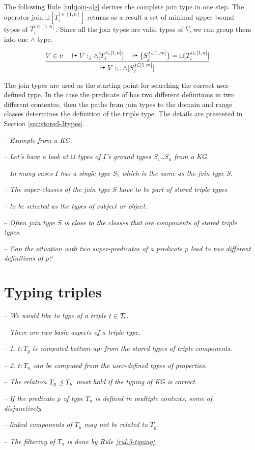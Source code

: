 \documentclass[runningheads]{llncs}
\newcommand{\darr}{\downarrow}
\newcommand{\vdasharr}{%
    \mathrel{%
        \vdash\hspace*{-5pt}%
        \raisebox{2.3pt}{\scalebox{.5}{\(\blacktriangleright\)}}%
    }%
}\newcommand{\D}{{\Delta}}
\newcommand{\T}{{\cal T}}
\newcommand{\notes}[1]{\noindent\begin{small}-- \emph{#1}\hfill\break\end{small}}
\newcommand{\nnotes}[1]{\indent\begin{small}-- \emph{#1}\hfill\break\end{small}}
\begin{document}
The following Rule \ref{rul:join-alg} derives the complete join type
in one step. The operator join $\sqcup[T_i^{i\in[1,n]}]$ returns as a
result a set of minimal upper bound types of $T_i^{i\in[1,n]}$. Since
all the join types are valid types of $V$, we can group them into one
$\land$ type.

\begin{equation}
\label{rul:join-alg} 
\dfrac{V\in\upsilon\quad\vdasharr\/V:_\darr\land[T_i^{i\in[1,n]}]\quad\/\vdasharr\{S_j^{j\in[1,m]}\}=\sqcup[T_i^{i\in[1,n]}]}
      {\vdasharr\/V:_\sqcup\land[S_j^{j\in[1,m]}]}
\end{equation}

The join types are used as the starting point for searching the
correct user-defined type. In the case the predicate of has two
different definitions in two different contextes, then the paths from
join types to the domain and range classes determines the definition
of the triple type. The details are presented in Section
\ref{sec:stored-3types}.


\notes{Example from a KG.}
\notes{Let's have a look at $\sqcup$ types of $I$'s ground types $S_1..S_n$ from a KG. }
\nnotes{In many cases $I$ has a single type $S_1$ which is the same as the join type $S$.}
\nnotes{The super-classes of the join type $S$ have to be part of stored triple types}
\nnotes{to be selected as the types of subject or object.}
\nnotes{Often join type $S$ is close to the classes that are components of stored triple types.}
\notes{Can the situation with two super-predicates of a predicate $p$ lead to two different definitions of $p$?}










\section{Typing triples\label{sec:triples}}


\notes{We would like to type of a triple $t\in\T_i$.}
\notes{There are two basic aspects of a triple type.}
\nnotes{1. $t:T_g$ is computed bottom-up: from the stored types of triple components.}
\nnotes{2. $t:T_u$ can be computed from the user-defined types of properties.}
\nnotes{The relation $T_g\preceq\/T_u$ must hold if the typing of KG is correct.}
\nnotes{If the predicate $p$ of type $T_u$ is defined in multiple contexts, some of disjunctively}
\nnotes{linked components of $T_u$ may not be related to $T_g$.}
\nnotes{The filtering of $T_u$ is done by Rule \ref{rul:3-typing}.}
\end{document}
